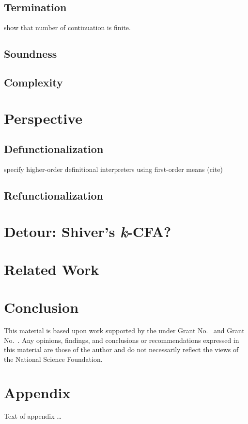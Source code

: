 \documentclass[acmsmall,review,anonymous]{acmart}\settopmatter{printfolios=true,printccs=false,printacmref=false}
\begin{document}
\subsection{Termination}

show that number of continuation is finite.

\subsection{Soundness}

\subsection{Complexity}

\section{Perspective}

\subsection{Defunctionalization}

specify higher-order definitional interpreters using first-order means (cite)

\subsection{Refunctionalization}

\section{Detour: Shiver's \textit{k}-CFA?}

\section{Related Work}

\section{Conclusion}

\begin{acks}                            %
  This material is based upon work supported by the
   under Grant
  No.~ and Grant
  No.~.  Any opinions, findings, and
  conclusions or recommendations expressed in this material are those
  of the author and do not necessarily reflect the views of the
  National Science Foundation.
\end{acks}



\appendix
\section{Appendix}

Text of appendix \ldots
\end{document}
